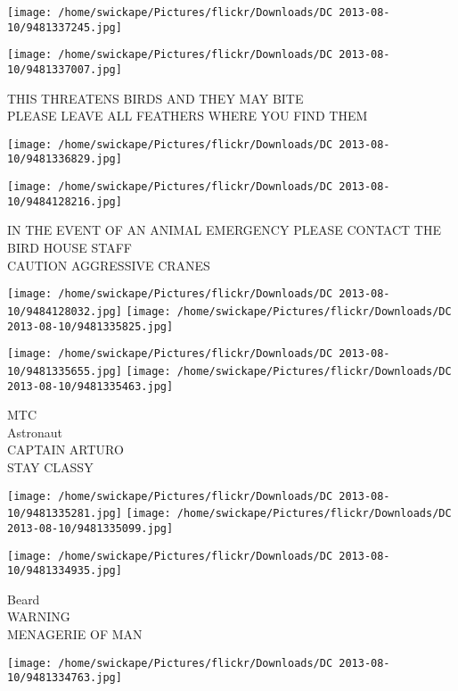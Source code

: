 \documentclass[10pt,letterpaper]{article}
\begin{document}
\texttt{[image: /home/swickape/Pictures/flickr/Downloads/DC 2013-08-10/9481337245.jpg]}

\vspace{0.25in}
\texttt{[image: /home/swickape/Pictures/flickr/Downloads/DC 2013-08-10/9481337007.jpg]}

THIS THREATENS BIRDS AND THEY MAY BITE\\
PLEASE LEAVE ALL FEATHERS WHERE YOU FIND THEM\\
\pagebreak

\texttt{[image: /home/swickape/Pictures/flickr/Downloads/DC 2013-08-10/9481336829.jpg]}

\vspace{0.25in}
\texttt{[image: /home/swickape/Pictures/flickr/Downloads/DC 2013-08-10/9484128216.jpg]}

IN THE EVENT OF AN ANIMAL EMERGENCY PLEASE CONTACT THE BIRD HOUSE STAFF\\
CAUTION AGGRESSIVE CRANES\\
\pagebreak

\texttt{[image: /home/swickape/Pictures/flickr/Downloads/DC 2013-08-10/9484128032.jpg]}
\texttt{[image: /home/swickape/Pictures/flickr/Downloads/DC 2013-08-10/9481335825.jpg]}

\texttt{[image: /home/swickape/Pictures/flickr/Downloads/DC 2013-08-10/9481335655.jpg]}
\texttt{[image: /home/swickape/Pictures/flickr/Downloads/DC 2013-08-10/9481335463.jpg]}

MTC\\
Astronaut\\
CAPTAIN ARTURO\\
STAY CLASSY\\
\pagebreak

\texttt{[image: /home/swickape/Pictures/flickr/Downloads/DC 2013-08-10/9481335281.jpg]}
\texttt{[image: /home/swickape/Pictures/flickr/Downloads/DC 2013-08-10/9481335099.jpg]}

\texttt{[image: /home/swickape/Pictures/flickr/Downloads/DC 2013-08-10/9481334935.jpg]}

Beard\\
WARNING\\
MENAGERIE OF MAN\\
\pagebreak

\texttt{[image: /home/swickape/Pictures/flickr/Downloads/DC 2013-08-10/9481334763.jpg]}
\end{document}
